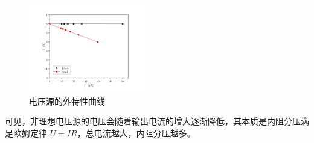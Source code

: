 \documentclass[a4paper,utf8]{article}
\begin{document}
        \begin{figure}[!ht]
            \caption{电压源的外特性曲线}
            \includegraphics[width=0.45\textwidth]{fig2.pdf}
        \end{figure}\par
        可见，非理想电压源的电压会随着输出电流的增大逐渐降低，其本质是内阻分压满足欧姆定律 $U=IR$，总电流越大，内阻分压越多。\newpage
\end{document}
